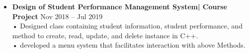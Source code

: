 \documentclass[a4paper,10pt]{article}
\begin{document}
\begin{itemize}
\item \textbf{Design of Student Performance Management System| Course Project} \hfill Nov 2018 – Jul 2019\\
• Designed class containing student information, student performance, and method to create, read, update, and delete instance in C++.\\
• developed a menu system that facilitates interaction with above Methods.

\end{itemize}
\end{document}
